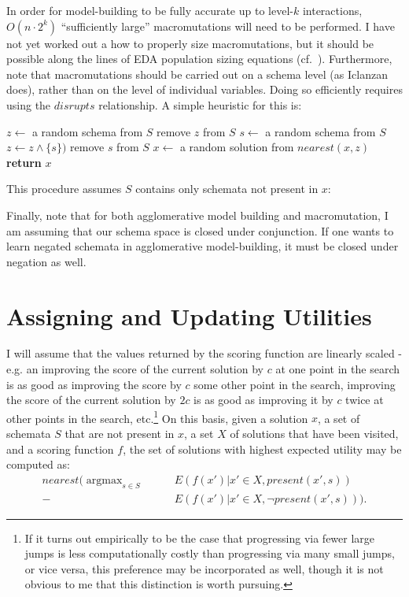 \documentclass[letterpaper]{article}
\DeclareMathOperator*{\argmax}{argmax}
\begin{document}
In order for model-building to be fully accurate up to level-$k$ interactions,
$O(n \cdot 2^k)$ ``sufficiently large'' macromutations will need to be
performed. I have not yet worked out a how to properly size macromutations, but
it should be possible along the lines of EDA population sizing equations
(cf.~\cite{DOI}). Furthermore, note that macromutations should be carried out
on a schema level (as Iclanzan does), rather than on the level of individual
variables. Doing so efficiently requires using the $disrupts$ relationship. A
simple heuristic for this is:
\begin{algorithmic}
  \State $z \leftarrow$ a random schema from $S$
  \State remove $z$ from $S$
    \State $s \leftarrow$ a random schema from $S$
      \State $z \leftarrow z \wedge \{s\})$
    \EndIf
    \State remove $s$ from $S$
    \State $x \leftarrow$ a random solution from $nearest(x,z)$
  \EndWhile
  \State \textbf{return} $x$
\EndProcedure
\end{algorithmic}
This procedure assumes $S$ contains only schemata not present in $x$:

Finally, note that for both agglomerative model building and macromutation, I
am assuming that our schema space is closed under conjunction. If one wants to
learn negated schemata in agglomerative model-building, it must be closed under
negation as well.

\section{Assigning and Updating Utilities}

I will assume that the values returned by the scoring function are linearly
scaled - e.g. an improving the score of the current solution by $c$ at one
point in the search is as good as improving the score by $c$ some other point
in the search, improving the score of the current solution by $2c$ is as good
as improving it by $c$ twice at other points in the search, etc.\footnote{If it
  turns out empirically to be the case that progressing via fewer large jumps
  is less computationally costly than progressing via many small jumps, or vice
  versa, this preference may be incorporated as well, though it is not obvious
  to me that this distinction is worth pursuing.}  On this basis, given a
solution $x$, a set of schemata $S$ that are not present in $x$, a set $X$ of
solutions that have been visited, and a scoring function $f$, the set of
solutions with highest expected utility may be computed as:
\begin{align}
nearest(\argmax_{s \in S} \qquad &E(f(x')|x' \in X, present(x',s)) \nonumber \\
                              - &E(f(x')|x' \in X, \neg present(x',s))) .
\end{align}
\end{document}
